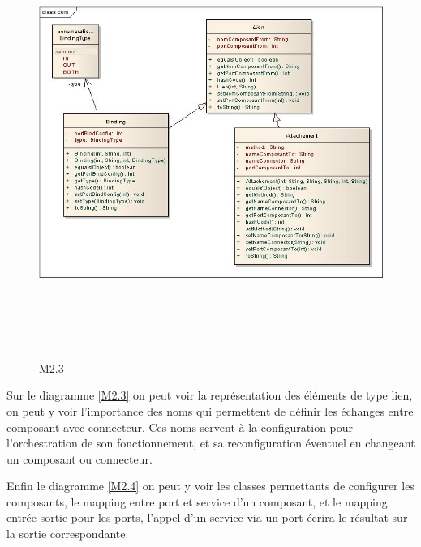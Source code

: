 \documentclass[11pt,a4paper]{article}
\begin{document}
\begin{figure}[h]
  		\centering
  		\includegraphics[height=14cm,width=15cm]{comimpl.jpg}
  		\caption{M2.3}
  		\label{Représentation des liens}
\end{figure}

Sur le diagramme \ref{M2.3} on peut voir la représentation des éléments de type lien, on peut y voir l'importance des noms qui permettent de définir les échanges entre composant avec connecteur. Ces noms servent à la configuration pour l'orchestration de son fonctionnement, et sa reconfiguration éventuel en changeant un composant ou connecteur.


Enfin le diagramme \ref{M2.4} on peut y voir les classes permettants de configurer les composants, le mapping entre port et service d'un composant, et le mapping entrée sortie pour les ports, l'appel d'un service via un port écrira le résultat sur la sortie correspondante.
\end{document}
